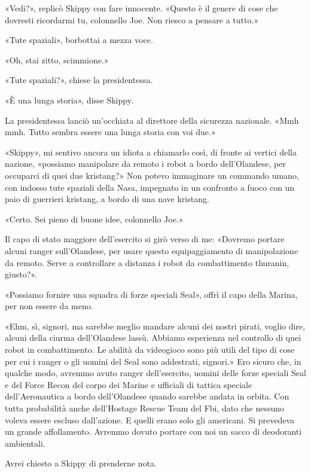 «Vedi?», replicò Skippy con fare innocente. «Questo è il genere di cose
che dovresti ricordarmi tu, colonnello Joe. Non riesco a pensare a
tutto.»

«Tute spaziali», borbottai a mezza voce.

«Oh, stai zitto, scimmione.»

«Tute spaziali?», chiese la presidentessa.

«È una lunga storia», disse Skippy.

La presidentessa lanciò un'occhiata al direttore della sicurezza
nazionale. «Mmh mmh. Tutto sembra essere una lunga storia con voi due.»

«Skippy», mi sentivo ancora un idiota a chiamarlo così, di fronte ai
vertici della nazione, «possiamo manipolare da remoto i robot a bordo
dell'Olandese, per occuparci di quei due kristang?» Non potevo
immaginare un commando umano, con indosso tute spaziali della Nasa,
impegnato in un confronto a fuoco con un paio di guerrieri kristang, a
bordo di una nave kristang.

«Certo. Sei pieno di buone idee, colonnello Joe.»

Il capo di stato maggiore dell'esercito si girò verso di me: «Dovremo
portare alcuni ranger sull'Olandese, per usare questo equipaggiamento di
manipolazione da remoto. Serve a controllare a distanza i robot da
combattimento thuranin, giusto?».

«Possiamo fornire una squadra di forze speciali Seal», offrì il capo
della Marina, per non essere da meno.

«Ehm, sì, signori, ma sarebbe meglio mandare alcuni dei nostri pirati,
voglio dire, alcuni della ciurma dell'Olandese lassù. Abbiamo esperienza
nel controllo di quei robot in combattimento. Le abilità da videogioco
sono più utili del tipo di cose per cui i ranger o gli uomini del Seal
sono addestrati, signori.» Ero sicuro che, in qualche modo, avremmo
avuto ranger dell'esercito, uomini delle forze speciali Seal e del Force
Recon del corpo dei Marine e ufficiali di tattica speciale
dell'Aeronautica a bordo dell'Olandese quando sarebbe andata in orbita.
Con tutta probabilità anche dell'Hostage Rescue Team del Fbi, dato che
nessuno voleva essere escluso dall'azione. E quelli erano solo gli
americani. Si prevedeva un grande affollamento. Avremmo dovuto portare
con noi un sacco di deodoranti ambientali.

Avrei chiesto a Skippy di prenderne nota.

\hfill\break

